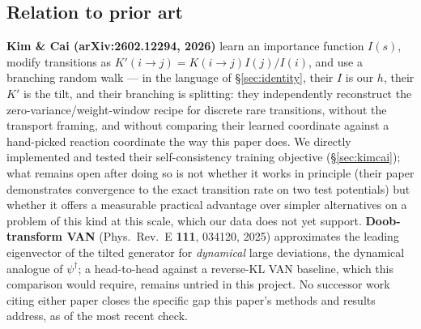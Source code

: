 \documentclass[a4paper,fleqn]{cas-sc}
\newcommand{\dg}{^{\dagger}}
\begin{document}
\subsection{Relation to prior art}\label{sec:pos}
\textbf{Kim \& Cai (arXiv:2602.12294, 2026)} learn an importance function $I(s)$, modify
transitions as $K'(i\to j)=K(i\to j)I(j)/I(i)$, and use a branching random walk --- in the
language of \S\ref{sec:identity}, their $I$ is our $h$, their $K'$ is the tilt, and their
branching is splitting: they independently reconstruct the zero-variance/weight-window
recipe for discrete rare transitions, without the transport framing, and without comparing
their learned coordinate against a hand-picked reaction coordinate the way this paper does.
We directly implemented and tested their self-consistency training objective
(\S\ref{sec:kimcai}); what remains open after doing so is not whether it works in
principle (their paper demonstrates convergence to the exact transition rate on two test
potentials) but whether it offers a measurable practical advantage over simpler
alternatives on a problem of this kind at this scale, which our data does not yet support.
\textbf{Doob-transform VAN} (Phys.\ Rev.\ E \textbf{111}, 034120, 2025) approximates the
leading eigenvector of the tilted generator for \emph{dynamical} large deviations, the
dynamical analogue of $\psi\dg$; a head-to-head against a reverse-KL VAN baseline, which
this comparison would require, remains untried in this project. No successor work citing
either paper closes the specific gap this paper's methods and results address, as of the
most recent check.

\FloatBarrier

\end{document}
